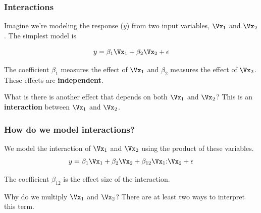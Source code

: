 \documentclass{beamer}
\begin{document}
\newcommand\mathcolon{{:}}

\begin{frame}
\frametitle{Interactions}	

Imagine we're modeling the response ($y$) from two input variables, $\Vx_1$ and $\Vx_2$. The simplest model is

\[ y = \beta_1\Vx_1 + \beta_2\Vx_2 + \epsilon \]

\pause
The coefficient $\beta_1$ measures the effect of $\Vx_1$ and $\beta_2$ measures the effect of $\Vx_2$. These effects are \textbf{independent}.

\bigskip
\pause
What is there is another effect that depends on both $\Vx_1$ and $\Vx_2$? This is an \textbf{interaction} between $\Vx_1$ and $\Vx_2$.
\end{frame}

\begin{frame}
\frametitle{How do we model interactions?}

We model the interaction of $\Vx_1$ and $\Vx_2$ using the product of these variables.
\[ y = \beta_1\Vx_1 + \beta_2\Vx_2 + \beta_{12}\Vx_1\mathcolon\Vx_2 + \epsilon \]

The coefficient $\beta_{12}$ is the effect size of the interaction.

\pause
\bigskip
Why do we multiply $\Vx_1$ and $\Vx_2$? There are at least two ways to interpret this term.
\end{frame}
\end{document}
